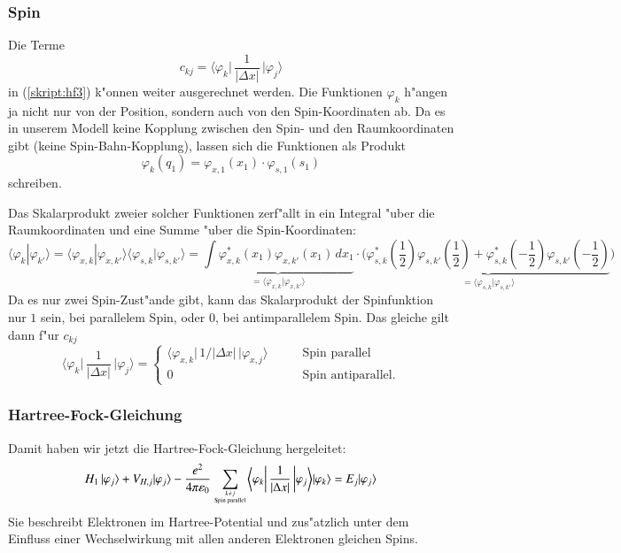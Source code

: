 \subsubsection{Spin}
Die Terme
\[
c_{kj}
=
\biggl\langle\varphi_k\biggl|\,
\frac{1}{|\Delta x|}
\,\biggr|\varphi_j\biggr\rangle
\]
in (\ref{skript:hf3})  k"onnen weiter ausgerechnet werden.
Die Funktionen $\varphi_k$ h"angen ja nicht nur von der Position, sondern
auch von den Spin-Koordinaten ab.
Da es in unserem Modell keine Kopplung zwischen den Spin- und
den Raumkoordinaten gibt (keine Spin-Bahn-Kopplung), lassen sich die
Funktionen als Produkt
\[
\varphi_k(q_1)=\varphi_{x,1}(x_1)\cdot\varphi_{s,1}(s_1)
\]
schreiben.

Das Skalarprodukt zweier solcher Funktionen zerf"allt in ein Integral
"uber die Raumkoordinaten und eine Summe "uber die Spin-Koordinaten:
\[
\langle\varphi_k|\varphi_{k'}\rangle
=
\langle\varphi_{x,k}|\varphi_{x,k'}\rangle
\langle\varphi_{s,k}|\varphi_{s,k'}\rangle
=
\underbrace{
\int\varphi_{x,k}^*(x_1)\varphi_{x,k'}(x_1)\,dx_1
}_{=\langle\varphi_{x,k}|\varphi_{x,k'}\rangle}
\cdot
\big(
\underbrace{
\varphi_{s,k}^*(\textstyle \frac12) \varphi_{s,k'}(\textstyle \frac12)
+
\varphi_{s,k}^*(\textstyle-\frac12) \varphi_{s,k'}(\textstyle-\frac12)
}_{=\langle\varphi_{s,k}|\varphi_{s,k'}\rangle}
\big)
\]
Da es nur zwei Spin-Zust"ande gibt, kann das Skalarprodukt der Spinfunktion
nur $1$ sein, bei parallelem Spin, oder $0$, bei antimparallelem Spin.
Das gleiche gilt dann f"ur  $c_{kj}$
\[
\biggl\langle\varphi_k\biggl|\,
\frac{1}{|\Delta x|}
\,\biggr|\varphi_j\biggr\rangle
=
\begin{cases}
\langle\varphi_{x,k}|\, 1/|\Delta x|\,|\varphi_{x,j}\rangle
&\qquad\text{Spin parallel}
\\
0&\qquad\text{Spin antiparallel}.
\end{cases}
\]

\subsubsection{Hartree-Fock-Gleichung}
Damit haben wir jetzt die Hartree-Fock-Gleichung hergeleitet:
\begin{align}
H_1\,|\varphi_j\rangle
+
V_{H,j}
|\varphi_j\rangle
-
\frac{e^2}{4\pi\varepsilon_0}
\sum_{{k\ne j}\atop{\text{Spin parallel}}}
\biggl\langle\varphi_k\biggl|\,
\frac{1}{|\Delta x|}
\,\biggr|\varphi_j\biggr\rangle
|\varphi_k\rangle
=
E_j
| \varphi_j\rangle
\label{skript:hf4}
\end{align}
Sie beschreibt Elektronen im Hartree-Potential und zus"atzlich unter
dem Einfluss einer Wechselwirkung mit allen anderen Elektronen
gleichen Spins.



